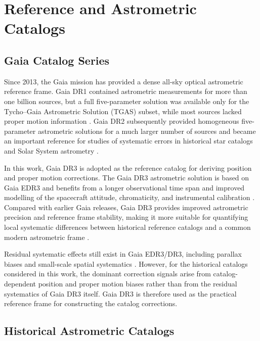 \documentclass[linenumbers,amsmath,manuscript]{aastex702}
\begin{document}
\section{Reference and Astrometric Catalogs} \label{sec:catalogs}

\subsection{Gaia Catalog Series} \label{subsec:gaia}

Since 2013, the Gaia mission has provided a dense all-sky optical astrometric reference frame. Gaia DR1 contained astrometric measurements for more than one billion sources, but a full five-parameter solution was available only for the Tycho--Gaia Astrometric Solution (TGAS) subset, while most sources lacked proper motion information \citep{GaiaDR1,Lindegren2016}. Gaia DR2 subsequently provided homogeneous five-parameter astrometric solutions for a much larger number of sources and became an important reference for studies of systematic errors in historical star catalogs and Solar System astrometry \citep{GaiaDR2}.

In this work, Gaia DR3 is adopted as the reference catalog for deriving position and proper motion corrections. The Gaia DR3 astrometric solution is based on Gaia EDR3 and benefits from a longer observational time span and improved modelling of the spacecraft attitude, chromaticity, and instrumental calibration \citep{GaiaDR3,Lindegren2021EDR3}. Compared with earlier Gaia releases, Gaia DR3 provides improved astrometric precision and reference frame stability, making it more suitable for quantifying local systematic differences between historical reference catalogs and a common modern astrometric frame \citep{Fabricius2021}.

Residual systematic effects still exist in Gaia EDR3/DR3, including parallax biases and small-scale spatial systematics \citep{Lindegren2021Systematics}. However, for the historical catalogs considered in this work, the dominant correction signals arise from catalog-dependent position and proper motion biases rather than from the residual systematics of Gaia DR3 itself. Gaia DR3 is therefore used as the practical reference frame for constructing the catalog corrections.

\subsection{Historical Astrometric Catalogs} \label{subsec:historical}
\end{document}
